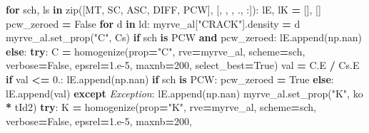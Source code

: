 \documentclass[
  a4paper,
  numbers=noendperiod,
  DIV=12]{scrreprt}
\newenvironment{Shaded}{\begin{snugshade}}{\end{snugshade}}
\newcommand{\BuiltInTok}[1]{#1}
\newcommand{\ControlFlowTok}[1]{\textcolor[rgb]{0.13,0.29,0.53}{\textbf{#1}}}
\newcommand{\DecValTok}[1]{\textcolor[rgb]{0.00,0.00,0.81}{#1}}
\newcommand{\FloatTok}[1]{\textcolor[rgb]{0.00,0.00,0.81}{#1}}
\newcommand{\KeywordTok}[1]{\textcolor[rgb]{0.13,0.29,0.53}{\textbf{#1}}}
\newcommand{\NormalTok}[1]{#1}
\newcommand{\OperatorTok}[1]{\textcolor[rgb]{0.81,0.36,0.00}{\textbf{#1}}}
\newcommand{\PreprocessorTok}[1]{\textcolor[rgb]{0.56,0.35,0.01}{\textit{#1}}}
\newcommand{\StringTok}[1]{\textcolor[rgb]{0.31,0.60,0.02}{#1}}
\newcommand{\VariableTok}[1]{\textcolor[rgb]{0.00,0.00,0.00}{#1}}
\begin{document}
\begin{Shaded}
\begin{Highlighting}[]
\ControlFlowTok{for}\NormalTok{ sch, ls }\KeywordTok{in} \BuiltInTok{zip}\NormalTok{([MT, SC, ASC, DIFF, PCW],}
\NormalTok{                   [}\StringTok{\textquotesingle{}{-}\textquotesingle{}}\NormalTok{, }\StringTok{\textquotesingle{}{-}\textquotesingle{}}\NormalTok{, }\StringTok{\textquotesingle{}{-}{-}\textquotesingle{}}\NormalTok{, }\StringTok{\textquotesingle{}{-}.\textquotesingle{}}\NormalTok{, }\StringTok{\textquotesingle{}:\textquotesingle{}}\NormalTok{]):}
\NormalTok{    lE, lK }\OperatorTok{=}\NormalTok{ [], []}
\NormalTok{    pcw\_zeroed }\OperatorTok{=} \VariableTok{False}
    \ControlFlowTok{for}\NormalTok{ d }\KeywordTok{in}\NormalTok{ ld:}
\NormalTok{        myrve\_al[}\StringTok{"CRACK"}\NormalTok{].density }\OperatorTok{=}\NormalTok{ d}
\NormalTok{        myrve\_al.set\_prop(}\StringTok{"C"}\NormalTok{, Cs)}
        \ControlFlowTok{if}\NormalTok{ sch }\KeywordTok{is}\NormalTok{ PCW }\KeywordTok{and}\NormalTok{ pcw\_zeroed:}
\NormalTok{            lE.append(np.nan)}
        \ControlFlowTok{else}\NormalTok{:}
            \ControlFlowTok{try}\NormalTok{:}
\NormalTok{                C }\OperatorTok{=}\NormalTok{ homogenize(prop}\OperatorTok{=}\StringTok{"C"}\NormalTok{, rve}\OperatorTok{=}\NormalTok{myrve\_al, scheme}\OperatorTok{=}\NormalTok{sch,}
\NormalTok{                               verbose}\OperatorTok{=}\VariableTok{False}\NormalTok{, epsrel}\OperatorTok{=}\FloatTok{1.e{-}5}\NormalTok{, maxnb}\OperatorTok{=}\DecValTok{200}\NormalTok{,}
\NormalTok{                               select\_best}\OperatorTok{=}\VariableTok{True}\NormalTok{)}
\NormalTok{                val }\OperatorTok{=}\NormalTok{ C.E }\OperatorTok{/}\NormalTok{ Cs.E}
                \ControlFlowTok{if}\NormalTok{ val }\OperatorTok{\textless{}=} \FloatTok{0.}\NormalTok{:}
\NormalTok{                    lE.append(np.nan)}
                    \ControlFlowTok{if}\NormalTok{ sch }\KeywordTok{is}\NormalTok{ PCW:}
\NormalTok{                        pcw\_zeroed }\OperatorTok{=} \VariableTok{True}
                \ControlFlowTok{else}\NormalTok{:}
\NormalTok{                    lE.append(val)}
            \ControlFlowTok{except} \PreprocessorTok{Exception}\NormalTok{:}
\NormalTok{                lE.append(np.nan)}
\NormalTok{        myrve\_al.set\_prop(}\StringTok{"K"}\NormalTok{, ko }\OperatorTok{*}\NormalTok{ tId2)}
        \ControlFlowTok{try}\NormalTok{:}
\NormalTok{            K }\OperatorTok{=}\NormalTok{ homogenize(prop}\OperatorTok{=}\StringTok{"K"}\NormalTok{, rve}\OperatorTok{=}\NormalTok{myrve\_al, scheme}\OperatorTok{=}\NormalTok{sch,}
\NormalTok{                           verbose}\OperatorTok{=}\VariableTok{False}\NormalTok{, epsrel}\OperatorTok{=}\FloatTok{1.e{-}5}\NormalTok{, maxnb}\OperatorTok{=}\DecValTok{200}\NormalTok{,}

\end{Highlighting}
\end{Shaded}
\end{document}
